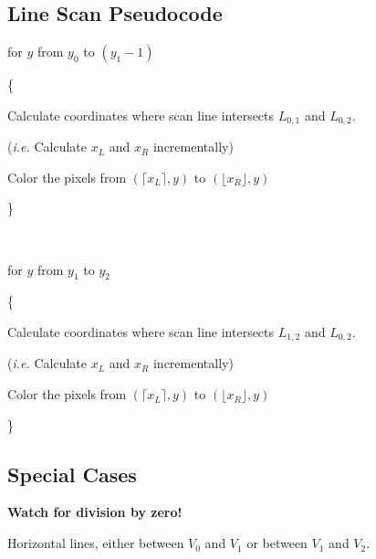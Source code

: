\documentclass[12pt]{article}
\begin{document}
\begin{spacing}{1.2}

\subsection{Line Scan Pseudocode}

for $y$ from $y_0$ to $(y_1 - 1)$

\{

\qquad Calculate coordinates where scan line intersects $L_{0,1}$ and $L_{0,2}$.  

\qquad \qquad ({\it i.e.} Calculate $x_L$ and $x_R$ incrementally)

\qquad Color the pixels from $\left( \lceil x_L \rceil, y \right)$ to $\left( \lfloor x_R \rfloor, y \right)$


\}



\

for $y$ from $y_1$ to $y_2$

\{

\qquad Calculate coordinates where scan line intersects $L_{1,2}$ and $L_{0,2}$.  

\qquad \qquad ({\it i.e.} Calculate $x_L$ and $x_R$ incrementally)

\qquad Color the pixels from $\left( \lceil x_L \rceil, y \right)$ to $\left( \lfloor x_R \rfloor, y \right)$


\}

\subsection{Special Cases}

{\bf Watch for division by zero!}

Horizontal lines, either between $V_0$ and $V_1$ or between $V_1$ and $V_2$.  


\end{spacing}
\end{document}

